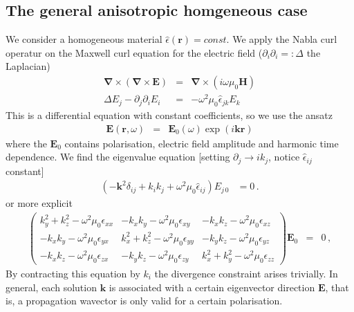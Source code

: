 \documentclass[12pt,a4paper,twoside,openright,BCOR10mm,headsepline,titlepage,abstracton,chapterprefix,final]{scrreprt}
\newcommand\Vector[1]{{\mathbf{#1}}}
\newcommand\vacuum{0}
\newcommand\Location{\Vector{r}}
\newcommand\wavenumber{k}
\newcommand\Wavevector{\Vector{\wavenumber}}
\newcommand\Nabla{\Vector{\nabla}}
\newcommand\Tensor[1]{\hat{#1}}
\newcommand\scalarEfield{E}
\newcommand\scalarHfield{H}
\newcommand\Efield{\Vector{\scalarEfield}}
\newcommand\Hfield{\Vector{\scalarHfield}}
\newcommand\vacuumpermeability{\mu_{\vacuum}}
\newcommand\permittivity{\Tensor{\epsilon}}
\newcommand\scalarpermittivity{\epsilon}
\newcommand{\chk}[1]{\color{green}{$\checkmark$#1}}
\begin{document}
\subsection{The general anisotropic homgeneous case\chk{JH}}
We consider a homogeneous material $\permittivity(\Location) = const.$ We apply the Nabla curl operatur on the Maxwell curl equation for the electric field
($\partial_i \partial_i =: \Delta$ the Laplacian)
\begin{eqnarray}
  \Nabla \times ( \Nabla \times \Efield ) &=& \Nabla \times ( i \omega \vacuumpermeability \Hfield ) 
  \\
  \Delta \scalarEfield_j - \partial_j \partial_i \scalarEfield_i &=& - \omega^2 \vacuumpermeability \permittivity_{jk} \scalarEfield_{k}
\end{eqnarray}
This is a differential equation with constant coefficients, so we use the ansatz
\begin{eqnarray}
 \Efield(\Location,\omega) &=& \Efield_0(\omega) \exp(i \Wavevector \Location)
\end{eqnarray}
where the $\Efield_0$ contains polarisation, electric field amplitude and harmonic time dependence. We find the eigenvalue equation [setting $\partial_j \to i k_j$, notice $\permittivity_{ij}$ constant]
\begin{align}
 \left(-\Vector{k}^2 \delta_{ij} + k_i k_j + \omega^2 \mu_0 \permittivity_{ij} \right) E_{j\,0} &= 0 \,.
\end{align}
or more explicit
\begin{eqnarray}
\begin{pmatrix}
 \wavenumber_y^2 + \wavenumber_z^2 - \omega^2 \vacuumpermeability \scalarpermittivity_{xx} 
 &
 - \wavenumber_x \wavenumber_y - \omega^2 \vacuumpermeability \scalarpermittivity_{xy}
 &
 - \wavenumber_x \wavenumber_z - \omega^2 \vacuumpermeability \scalarpermittivity_{xz}
 \\
 - \wavenumber_x \wavenumber_y - \omega^2 \vacuumpermeability \scalarpermittivity_{yx}
 &
 \wavenumber_x^2 + \wavenumber_z^2 - \omega^2 \vacuumpermeability \scalarpermittivity_{yy} 
 &
 - \wavenumber_y \wavenumber_z - \omega^2 \vacuumpermeability \scalarpermittivity_{yz}
 \\
 - \wavenumber_x \wavenumber_z - \omega^2 \vacuumpermeability \scalarpermittivity_{zx}
 &
 - \wavenumber_y \wavenumber_z - \omega^2 \vacuumpermeability \scalarpermittivity_{zy}
 &
 \wavenumber_x^2 + \wavenumber_y^2 - \omega^2 \vacuumpermeability \scalarpermittivity_{zz}  
\end{pmatrix}
\Efield_0
&=& 0\,, \label{eq:generalDispersionEigenEquation}
\end{eqnarray}
By contracting this equation by $k_i$ the divergence constraint arises trivially.
In general, each solution $\Wavevector$ is associated with a certain eigenvector direction $\Efield$,
that is, a propagation wavector is only valid for a certain polarisation.
\end{document}
